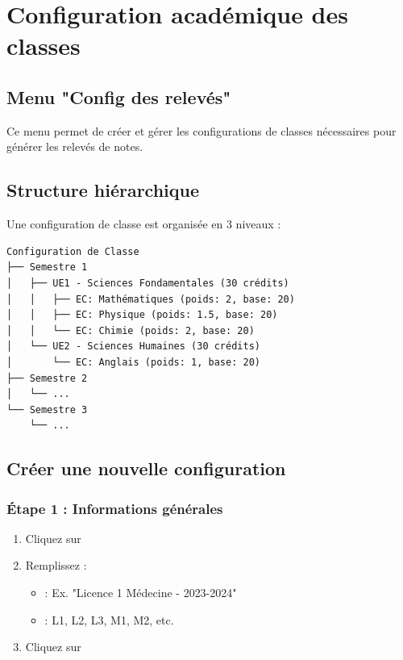 \section{Configuration académique des classes}

\subsection{Menu "Config des relevés"}

Ce menu permet de créer et gérer les configurations de classes nécessaires pour générer les relevés de notes.

\subsection{Structure hiérarchique}

Une configuration de classe est organisée en 3 niveaux :

\begin{verbatim}
Configuration de Classe
├── Semestre 1
│   ├── UE1 - Sciences Fondamentales (30 crédits)
│   │   ├── EC: Mathématiques (poids: 2, base: 20)
│   │   ├── EC: Physique (poids: 1.5, base: 20)
│   │   └── EC: Chimie (poids: 2, base: 20)
│   └── UE2 - Sciences Humaines (30 crédits)
│       └── EC: Anglais (poids: 1, base: 20)
├── Semestre 2
│   └── ...
└── Semestre 3
    └── ...
\end{verbatim}

\subsection{Créer une nouvelle configuration}

\subsubsection{Étape 1 : Informations générales}

\begin{enumerate}[leftmargin=*]
    \item Cliquez sur 
    \item Remplissez :
    \begin{itemize}
        \item {} : Ex. "Licence 1 Médecine - 2023-2024"
        \item {} : L1, L2, L3, M1, M2, etc.
    \end{itemize}
    \item Cliquez sur 
\end{enumerate}

